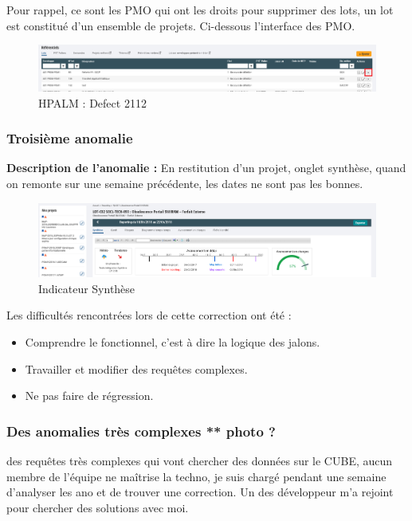 Pour rappel, ce sont les PMO qui ont les droits pour supprimer des lots, un lot est constitué d'un ensemble de projets. Ci-dessous l'interface des PMO.

\begin{figure}[!h]
\centering
\includegraphics[width=1\textwidth]{images/ano2.png}
\caption{HPALM : Defect 2112}
\end{figure}


\subsubsection{Troisième anomalie }

\textbf{Description de l'anomalie :} En restitution d'un projet, onglet synthèse, quand on remonte sur une semaine précédente, les dates ne sont pas les bonnes. 

\begin{figure}[!h]
\centering
\includegraphics[width=1\textwidth]{images/ppil-indicateur-synthese.PNG}
\caption{Indicateur Synthèse}
\end{figure}

Les difficultés rencontrées lors de cette correction ont été :
\begin{itemize}
    \item Comprendre le fonctionnel, c'est à dire la logique des jalons.
    \item Travailler et modifier des requêtes complexes.
    \item Ne pas faire de régression.
\end{itemize}


\subsubsection{Des anomalies très complexes ** photo ?}

des requêtes très complexes qui vont chercher des données sur le CUBE, aucun membre de l'équipe ne maîtrise la techno, je suis chargé pendant une semaine d'analyser les ano et de trouver une correction. Un des développeur m'a rejoint pour chercher des solutions avec moi.


